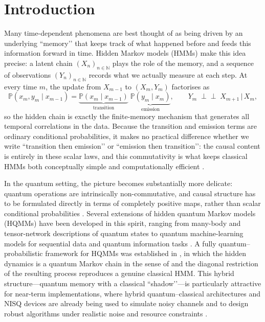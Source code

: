 \documentclass[11pt, reco]{article}
\begin{document}
\section{Introduction}
Many time-dependent phenomena are best thought of as being driven by an underlying “memory’’ that keeps track of what happened before and feeds this information forward in time. Hidden Markov models (HMMs) \cite{Rab2002,Mor2021} make this idea precise: a latent chain \((X_n)_{n\in\mathbb{N}}\) plays the role of the memory, and a sequence of observations \((Y_n)_{n\in\mathbb{N}}\) records what we actually measure at each step. At every time \(m\), the update from \(X_{m-1}\) to \((X_m,Y_m)\) factorises as
\[
\mathbb{P}(x_m,y_m\mid x_{m-1})
=
\underbrace{\mathbb{P}(x_m \mid x_{m-1})}_{\text{transition}}
\;\underbrace{\mathbb{P}(y_m \mid x_m)}_{\text{emission}},
\qquad
Y_m\;\perp\!\!\!\perp\;X_{m+1}\,\big\vert\,X_m,
\]
so the hidden chain is exactly the finite-memory mechanism that generates all temporal correlations in the data. Because the transition and emission terms are ordinary conditional probabilities, it makes no practical difference whether we write “transition then emission’’ or “emission then transition’’: the causal content is entirely in these scalar laws, and this commutativity is what keeps classical  HMMs both conceptually simple and computationally efficient \cite{V03,FV05}.

In the quantum setting, the picture becomes substantially more delicate: quantum operations are intrinsically non-commutative, and causal structure has to be formulated directly in terms of completely positive maps, rather than scalar conditional probabilities \cite{WechsEtAl21,WechsEtAl21b}. Several extensions of hidden quantum Markov models (HQMMs) have been developed in this spirit, ranging from many-body and tensor-network descriptions of quantum states to quantum machine-learning models for sequential data and quantum information tasks \cite{Monras11,Srin2017,Clark15}. A fully quantum–probabilistic framework for HQMMs was established in \cite{AGLS24Q}, in which the hidden dynamics is a quantum Markov chain in the sense of \cite{Acc74,ASS20} and the diagonal restriction of the resulting process reproduces a genuine classical HMM. This hybrid structure—quantum memory with a classical “shadow’’—is particularly attractive for near-term implementations, where hybrid quantum–classical architectures and NISQ devices are already being used to simulate noisy channels and to design robust algorithms under realistic noise and resource constraints \cite{David24,De22,Bab22}.
\end{document}
